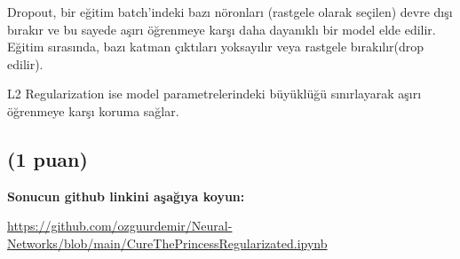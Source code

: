 \documentclass[11pt]{article}
\begin{document}
Dropout, bir eğitim batch'indeki bazı nöronları (rastgele olarak seçilen) devre dışı bırakır ve bu sayede aşırı öğrenmeye karşı daha dayanıklı bir model elde edilir. Eğitim sırasında, bazı katman çıktıları yoksayılır veya rastgele bırakılır(drop edilir). 

L2 Regularization ise model parametrelerindeki büyüklüğü sınırlayarak aşırı öğrenmeye karşı koruma sağlar.

\subsection{(1 puan)} \textbf{Sonucun github linkini  aşağıya koyun:}

\url{https://github.com/ozguurdemir/Neural-Networks/blob/main/CureThePrincessRegularizated.ipynb}
\end{document}
